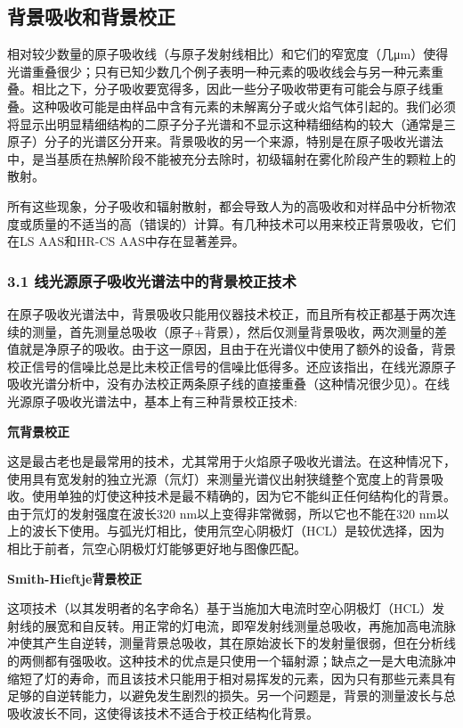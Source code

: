 \subsection{背景吸收和背景校正}

相对较少数量的原子吸收线（与原子发射线相比）和它们的窄宽度（几μm）使得光谱重叠很少；只有已知少数几个例子表明一种元素的吸收线会与另一种元素重叠。相比之下，分子吸收要宽得多，因此一些分子吸收带更有可能会与原子线重叠。这种吸收可能是由样品中含有元素的未解离分子或火焰气体引起的。我们必须将显示出明显精细结构的二原子分子光谱和不显示这种精细结构的较大（通常是三原子）分子的光谱区分开来。背景吸收的另一个来源，特别是在原子吸收光谱法中，是当基质在热解阶段不能被充分去除时，初级辐射在雾化阶段产生的颗粒上的散射。

所有这些现象，分子吸收和辐射散射，都会导致人为的高吸收和对样品中分析物浓度或质量的不适当的高（错误的）计算。有几种技术可以用来校正背景吸收，它们在LS AAS和HR-CS AAS中存在显著差异。

\subsubsection{3.1 线光源原子吸收光谱法中的背景校正技术}

在原子吸收光谱法中，背景吸收只能用仪器技术校正，而且所有校正都基于两次连续的测量，首先测量总吸收（原子+背景），然后仅测量背景吸收，两次测量的差值就是净原子的吸收。由于这一原因，且由于在光谱仪中使用了额外的设备，背景校正信号的信噪比总是比未校正信号的信噪比低得多。还应该指出，在线光源原子吸收光谱分析中，没有办法校正两条原子线的直接重叠（这种情况很少见）。在线光源原子吸收光谱法中，基本上有三种背景校正技术:

\textbf{氘背景校正}

这是最古老也是最常用的技术，尤其常用于火焰原子吸收光谱法。在这种情况下，使用具有宽发射的独立光源（氘灯）来测量光谱仪出射狭缝整个宽度上的背景吸收。使用单独的灯使这种技术是最不精确的，因为它不能纠正任何结构化的背景。由于氘灯的发射强度在波长320 nm以上变得非常微弱，所以它也不能在320 nm以上的波长下使用。与弧光灯相比，使用氘空心阴极灯（HCL）是较优选择，因为相比于前者，氘空心阴极灯灯能够更好地与图像匹配。

\textbf{Smith-Hieftje背景校正}

这项技术（以其发明者的名字命名）基于当施加大电流时空心阴极灯（HCL）发射线的展宽和自反转。用正常的灯电流，即窄发射线测量总吸收，再施加高电流脉冲使其产生自逆转，测量背景总吸收，其在原始波长下的发射量很弱，但在分析线的两侧都有强吸收。这种技术的优点是只使用一个辐射源；缺点之一是大电流脉冲缩短了灯的寿命，而且该技术只能用于相对易挥发的元素，因为只有那些元素具有足够的自逆转能力，以避免发生剧烈的损失。另一个问题是，背景的测量波长与总吸收波长不同，这使得该技术不适合于校正结构化背景。


